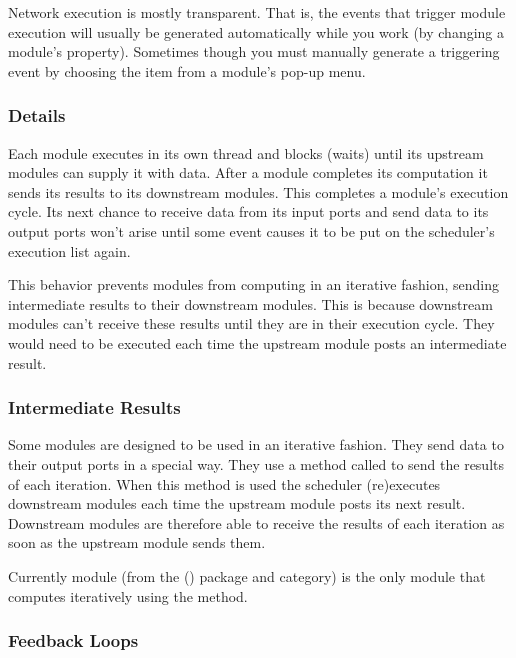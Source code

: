 Network execution is mostly transparent.  That is, the events that trigger
module execution will usually be generated automatically while you work
(\eg by changing a module's property).  Sometimes though you must manually
generate a triggering event by choosing the  item from a
module's pop-up menu.

\subsubsection{Details}

Each module executes in its own thread and blocks (waits) until its upstream
modules can supply it with data.  After a module completes its computation
it sends its results to its downstream modules.  This completes a module's
execution cycle.  Its next chance to receive data from its input ports
and send data to its output ports won't arise until some event
causes it to be put on the scheduler's execution list again.  

This behavior prevents modules from computing in an iterative fashion,
sending intermediate results to their downstream modules.  This is because
downstream modules can't receive these results until they are in their
execution cycle.  They would need to be executed each time the
upstream module posts an intermediate result.


\subsubsection{Intermediate Results}

Some modules are designed to be used in an iterative fashion.  They send
data to their output ports in a special way.  They use a method called
 to send the results of each iteration.  When
this method is used the scheduler (re)executes downstream modules each time
the upstream module posts its next result.  Downstream modules are
therefore able to receive the results of each iteration as soon as the
upstream module sends them.

Currently module  (from the \package(\sr) package and
 category) is the only module that computes iteratively
using the  method.

\subsubsection{Feedback Loops}

